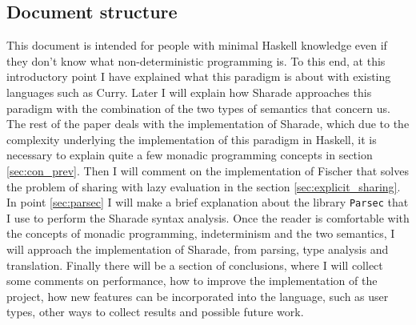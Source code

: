 \documentclass[class=article, crop=false]{standalone}
\begin{document}
\subsection{Document structure}
This document is intended for people with minimal Haskell knowledge even if they don't know
what non-deterministic programming is. To this end, at this introductory point I have
explained what this paradigm is about with existing languages such as Curry. Later I will
explain how Sharade approaches this paradigm with the combination of the two types of
semantics that concern us. The rest of the paper deals with the implementation of Sharade,
which due to the complexity underlying the implementation of this paradigm in Haskell, it is
necessary to explain quite a few monadic programming concepts in section \ref{sec:con_prev}.
Then I will comment on the implementation of Fischer that solves the problem of sharing with
lazy evaluation in the section \ref{sec:explicit_sharing}. In point \ref{sec:parsec} I will
make a brief explanation about the library \verb`Parsec` that I use to perform the Sharade
syntax analysis. Once the reader is comfortable with the concepts of monadic programming,
indeterminism and the two semantics, I will approach the implementation of Sharade, from
parsing, type analysis and translation. Finally there will be a section of conclusions, where
I will collect some comments on performance, how to improve the implementation of the
project, how new features can be incorporated into the language, such as user types, other
ways to collect results and possible future work.
\end{document}
